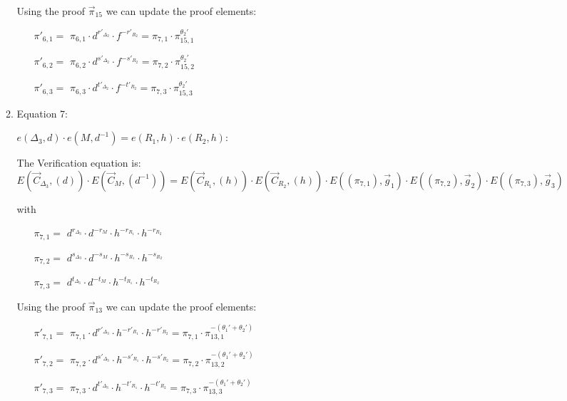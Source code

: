 \begin{description}
\begin{enumerate}
\begin{enumerate}
      Using the proof $\vec{\pi}_{15}$ we can update the proof elements:
      \begin{itemize}
      \item[$\pi'_{6,1} = $] $\pi_{6,1} \cdot d^{r'_{\Delta_2}} \cdot f^{-r'_{R_2}} = \pi_{7,1} \cdot \pi_{15,1}^{\theta_2'}$
      \item[$\pi'_{6,2} = $] $\pi_{6,2} \cdot d^{s'_{\Delta_2}} \cdot f^{-s'_{R_2}} = \pi_{7,2} \cdot \pi_{15,2}^{\theta_2'}$
      \item[$\pi'_{6,3} = $] $\pi_{6,3} \cdot d^{t'_{\Delta_2}} \cdot f^{-t'_{R_2}} = \pi_{7,3} \cdot \pi_{15,3}^{\theta_2'}$
      \end{itemize}
      
    \item Equation 7:

      $e(\boxed{\Delta_3},d) \cdot e(\boxed{M}, d^{-1})= e(\boxed{R_1}, h) \cdot e(\boxed{R_2}, h)$:
      
      The Verification equation is:  $E(\vec{C}_{\Delta_3}, (d)) \cdot E(\vec{C}_M, (d^{-1}))= E(\vec{C}_{R_1}, (h)) \cdot E(\vec{C}_{R_2}, (h)) \cdot E((\pi_{7,1}), \vec{g}_1)\cdot E((\pi_{7,2}), \vec{g}_2)\cdot E((\pi_{7,3}), \vec{g}_3)$
      
      with
      \begin{itemize}
      \item[$\pi_{7,1} = $] $d^{r_{\Delta_3}} \cdot d^{-r_M} \cdot h^{-r_{R_1}} \cdot h^{-r_{R_2}}$
      \item[$\pi_{7,2} = $] $d^{s_{\Delta_3}} \cdot d^{-s_M} \cdot h^{-s_{R_1}} \cdot h^{-s_{R_2}}$
      \item[$\pi_{7,3} = $] $d^{t_{\Delta_3}} \cdot d^{-t_M} \cdot h^{-t_{R_1}} \cdot h^{-t_{R_2}}$
      \end{itemize}   

      Using the proof $\vec{\pi}_{13}$ we can update the proof elements:
      \begin{itemize}
      \item[$\pi'_{7,1} = $] $\pi_{7,1} \cdot d^{r'_{\Delta_3}} \cdot h^{-r'_{R_1}} \cdot h^{-r'_{R_2}} = \pi_{7,1} \cdot \pi_{13,1}^{-(\theta_1'+\theta_2')}$
      \item[$\pi'_{7,2} = $] $\pi_{7,2} \cdot d^{s'_{\Delta_3}} \cdot h^{-s'_{R_1}} \cdot h^{-s'_{R_2}} = \pi_{7,2} \cdot \pi_{13,2}^{-(\theta_1'+\theta_2')}$
      \item[$\pi'_{7,3} = $] $\pi_{7,3} \cdot d^{t'_{\Delta_3}} \cdot h^{-t'_{R_1}} \cdot h^{-t'_{R_2}} = \pi_{7,3} \cdot \pi_{13,3}^{-(\theta_1'+\theta_2')}$
      \end{itemize}


\end{enumerate}
\end{enumerate}
\end{description}
